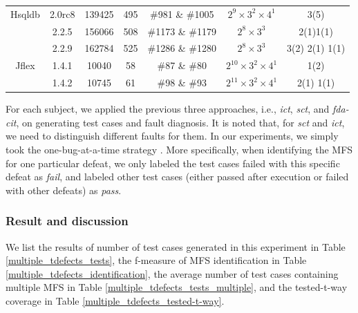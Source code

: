 \documentclass[10pt,journal,compsoc]{IEEEtran}
\begin{document}
{\begin{table}[ht]
\begin{tabular}{|c|c|c|c|c|c|c|}
Hsqldb& 2.0rc8 & 139425 & 495 &  \#981 \& \#1005 & $2^{9}\times 3^{2} \times 4^{1}$ & 3(5)\\
	  &2.2.5 & 156066 & 508 & \#1173 \&  \#1179 & $2^{8} \times 3^{3}$ & 2(1)1(1)\\
	    &2.2.9 & 162784 &525 & \#1286 \& \#1280 & $2^{8} \times 3^{3}$ & 3(2) 2(1) 1(1)\\ \hline
Jflex& 1.4.1 &  10040 &58 & \#87 \& \#80  & $2^{10} \times 3^{2} \times 4^{1}$ & 1(2)\\
    &  1.4.2 &  10745 &61 &  \#98 \& \#93 & $2^{11} \times 3^{2} \times 4^{1}$ & 2(1) 1(1)\\ \hline
\end{tabular}
\end{table}

For each subject, we applied the previous three approaches, i.e., \emph{ict}, \emph{sct}, and \emph{fda-cit}, on generating test cases and fault diagnosis. It is noted that, for \emph{sct} and \emph{ict}, we need to distinguish different faults for them. In our experiments, we simply took the one-bug-at-a-time strategy \cite{wong2016survey}. More specifically, when identifying the MFS for one particular defeat, we only labeled the test cases failed with this specific defeat as \emph{fail}, and labeled other test cases (either passed after execution or failed with other defeats) as \emph{pass}.

\subsubsection{Result and discussion}

We list the results of number of test cases generated in this experiment in Table \ref{multiple_tdefects_tests}, the f-measure of MFS identification in Table \ref{multiple_tdefects_identification}, the average number of test cases containing multiple MFS in Table \ref{multiple_tdefects_tests_multiple}, and the tested-t-way coverage in Table \ref{multiple_tdefects_tested-t-way}.

}
\end{document}
